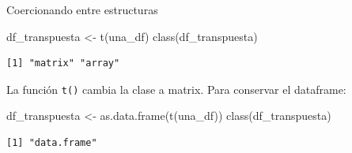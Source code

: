\documentclass[
  9pt,
  ignorenonframetext,
]{beamer}
\newenvironment{Shaded}{\begin{snugshade}}{\end{snugshade}}
\newcommand{\FunctionTok}[1]{\textcolor[rgb]{0.28,0.35,0.67}{#1}}
\newcommand{\NormalTok}[1]{\textcolor[rgb]{0.00,0.23,0.31}{#1}}
\newcommand{\OtherTok}[1]{\textcolor[rgb]{0.00,0.23,0.31}{#1}}
\begin{document}
\begin{frame}[fragile]{Coercionando entre estructuras}
\label{coercionando-entre-estructuras}
\begin{Shaded}
\begin{Highlighting}[]
\NormalTok{df\_transpuesta }\OtherTok{\textless{}{-}} \FunctionTok{t}\NormalTok{(una\_df)}
\FunctionTok{class}\NormalTok{(df\_transpuesta)}
\end{Highlighting}
\end{Shaded}

\begin{verbatim}
[1] "matrix" "array" 
\end{verbatim}

La función \texttt{t()} cambia la clase a matrix. Para conservar el
dataframe:

\begin{Shaded}
\begin{Highlighting}[]
\NormalTok{df\_transpuesta }\OtherTok{\textless{}{-}} \FunctionTok{as.data.frame}\NormalTok{(}\FunctionTok{t}\NormalTok{(una\_df))}
\FunctionTok{class}\NormalTok{(df\_transpuesta)}
\end{Highlighting}
\end{Shaded}

\begin{verbatim}
[1] "data.frame"
\end{verbatim}
\end{frame}
\end{document}
